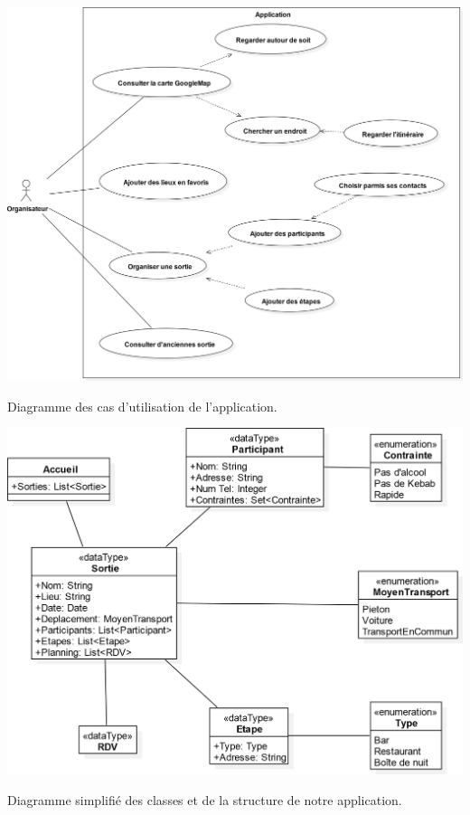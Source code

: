\documentclass[a4paper, 12pt, notitlepage]{article} %
\begin{document}
\begin{umlFig}[!htb]
   \centering
   \includegraphics[width=\textwidth]{CasDutilisation.png}
   \caption[Diagramme des cas d'utilisation]{Diagramme des cas d'utilisation de l'application.}
   \label{UML:CasDutilisation}
\end{umlFig}

\begin{umlFig}[!htb]
   \centering
   \includegraphics[width=\textwidth]{DiagrammeDeClasse.png}
   \caption[Diagramme de classe]{Diagramme simplifié des classes et de la structure de notre application.}
   \label{UML:Classe}
\end{umlFig}
\end{document}
